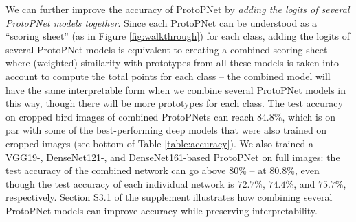 \documentclass{article}
\theoremstyle{definition}
\theoremstyle{remark}
\begin{document}
We can further improve the accuracy of ProtoPNet by \textit{adding the logits of several ProtoPNet models together}. Since each ProtoPNet can be understood as a ``scoring sheet'' (as in Figure \ref{fig:walkthrough}) for each class, adding the logits of several ProtoPNet models is equivalent to creating a combined scoring sheet where (weighted) similarity with prototypes from all these models is taken into account to compute the total points for each class -- the combined model will have the same interpretable form when we combine several ProtoPNet models in this way, though there will be more prototypes for each class. The test accuracy on cropped bird images of combined ProtoPNets can reach $84.8\%$, which is on par with some of the best-performing deep models that were also trained on cropped images (see bottom of Table \ref{table:accuracy}). We also trained a VGG19-, DenseNet121-, and DenseNet161-based ProtoPNet on full images: the test accuracy of the combined network can go above $80\%$ -- at $80.8\%$, even though the test accuracy of each individual network is $72.7\%$, $74.4\%$, and $75.7\%$, respectively. Section S3.1 of the supplement illustrates how combining several ProtoPNet models can improve accuracy while preserving interpretability.
\end{document}
